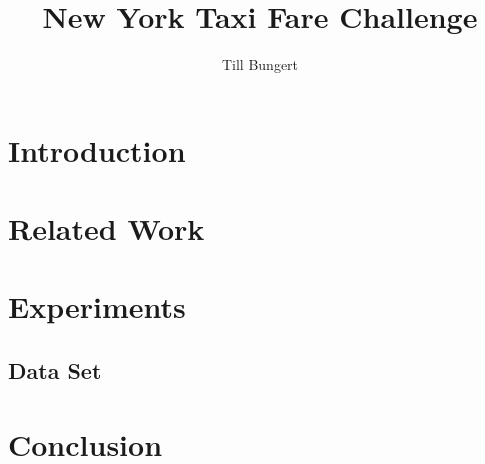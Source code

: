 \documentclass{article}
\title{New York Taxi Fare Challenge}
\author{Till Bungert}
\begin{document}
\maketitle

\begin{abstract}
\end{abstract}

\section{Introduction}%
\label{sec:introduction}


\section{Related Work}%
\label{sec:related_work}



\section{Experiments}%
\label{sec:experiments}

\subsection{Data Set}%
\label{sub:dataset}


\section{Conclusion}%
\label{sec:conclusion}
    

\printbibliography
\end{document}
